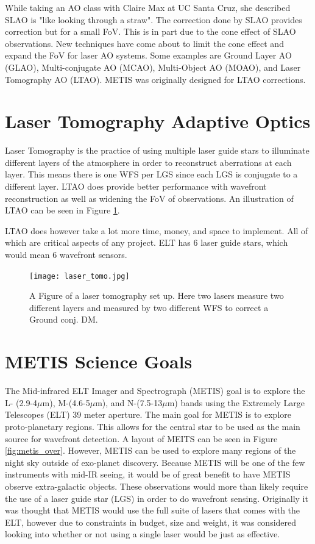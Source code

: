 While taking an AO class with Claire Max at UC Santa Cruz, she described SLAO is
"like looking through a straw".  The correction done by SLAO provides correction but
for a small FoV.  This is in part due to the cone effect of SLAO observations.  New
techniques have come about to limit the cone effect and expand the FoV for laser AO
systems.  Some examples are Ground Layer AO (GLAO), Multi-conjugate AO (MCAO),
Multi-Object AO (MOAO), and Laser Tomography AO (LTAO).  METIS was originally
designed for LTAO corrections.


\section{Laser Tomography Adaptive Optics}

Laser Tomography is the practice of using multiple laser guide stars to illuminate
different layers of the atmosphere in order to reconstruct aberrations at each
layer.  This means there is one WFS per LGS since each LGS is conjugate to a
different layer.  LTAO does provide better performance with wavefront reconstruction
as well as widening the FoV of observations.  An illustration of LTAO can be seen in
Figure \ref{fig:tomo}.

LTAO does however take a lot more time, money, and space to implement.  All of which
are critical aspects of any project.  ELT has 6 laser guide stars, which would mean
6 wavefront sensors.

\begin{figure}[h!]
\centering
\texttt{[image: laser\_tomo.jpg]}
\caption{A Figure of a laser tomography set up.  Here two lasers measure two different layers and measured by two different WFS to correct a Ground conj. DM. \cite{aomode}}
\label{fig:tomo}
\end{figure}

\section{METIS Science Goals}

The Mid-infrared ELT Imager and Spectrograph (METIS) goal is to explore the L-
(2.9-4$\mu$m), M-(4.6-5$\mu$m), and N-(7.5-13$\mu$m) bands using the Extremely Large
Telescopes (ELT) 39 meter aperture.  The main goal for METIS is to explore
proto-planetary regions.  This allows for the central star to be used as the main
source for wavefront detection.  A layout of MEITS can be seen in Figure
\ref{fig:metis_over}.  However, METIS can be used to explore many regions
of the night sky outside of exo-planet discovery.  Because METIS will be one of the
few instruments with mid-IR seeing, it would be of great benefit to have METIS
observe extra-galactic objects.  These observations would more than likely require
the use of a laser guide star (LGS) in order to do wavefront sensing.  Originally it
was thought that METIS would use the full suite of lasers that comes with the ELT,
however due to constraints in budget, size and weight, it was considered looking
into whether or not using a single laser would be just as effective.

